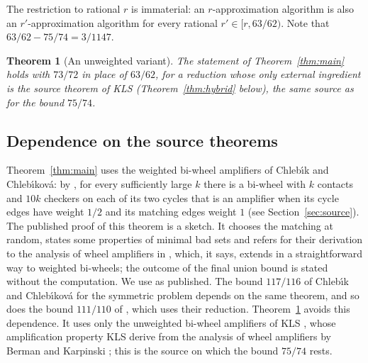 \documentclass[11pt]{amsart}
\newtheorem{theorem}{Theorem}[section]
\theoremstyle{definition}
\theoremstyle{remark}
\numberwithin{equation}{section}
\begin{document}
The restriction to rational $r$ is immaterial: an $r$-approximation algorithm is also an $r'$-approximation algorithm for every rational $r'\in[r,63/62)$. Note that $63/62-75/74=3/1147$.

\begin{theorem}[An unweighted variant]\label{thm:unweighted}
The statement of Theorem~\ref{thm:main} holds with $73/72$ in place of $63/62$, for a reduction whose only external ingredient is the source theorem of KLS (Theorem~\ref{thm:hybrid} below), the same source as for the bound $75/74$.
\end{theorem}

\subsection*{Dependence on the source theorems}
Theorem~\ref{thm:main} uses the weighted bi-wheel amplifiers of Chleb\'{\i}k and Chleb\'{\i}kov\'a: by \cite[Theorem~5]{CC22}, for every sufficiently large $k$ there is a bi-wheel with $k$ contacts and $10k$ checkers on each of its two cycles that is an amplifier when its cycle edges have weight $1/2$ and its matching edges weight $1$ (see Section~\ref{sec:source}). The published proof of this theorem \cite[\S5]{CC22} is a sketch. It chooses the matching at random, states some properties of minimal bad sets and refers for their derivation to the analysis of wheel amplifiers in \cite{CC03}, which, it says, extends in a straightforward way to weighted bi-wheels; the outcome of the final union bound is stated without the computation. We use \cite[Theorem~5]{CC22} as published. The bound $117/116$ of Chleb\'{\i}k and Chleb\'{\i}kov\'a for the symmetric problem depends on the same theorem, and so does the bound $111/110$ of \cite{NRT26}, which uses their reduction. Theorem~\ref{thm:unweighted} avoids this dependence. It uses only the unweighted bi-wheel amplifiers of KLS \cite[Theorem~1]{KLS15}, whose amplification property KLS derive from the analysis of wheel amplifiers by Berman and Karpinski \cite{BK01}; this is the source on which the bound $75/74$ rests.
\end{document}
